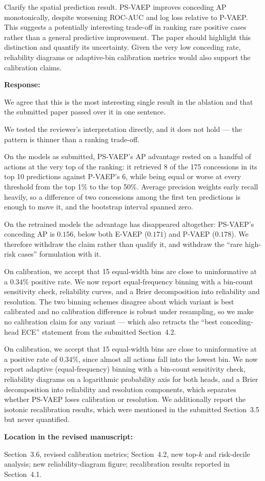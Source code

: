 \documentclass[11pt,a4paper]{article}
\newcommand{\pending}[1]{\textcolor{statuspending}{#1}}
\newcommand{\response}[2]{%
  \begin{responsebox}
  \textbf{Response:}

  #1
  \end{responsebox}
  \begin{locationbox}
  \textbf{Location in the revised manuscript:}

  #2
  \end{locationbox}
}
\begin{document}
\begin{reviewbox}[Comment 4]
Clarify the spatial prediction result. PS-VAEP improves conceding AP monotonically, despite worsening ROC-AUC and log loss relative to P-VAEP. This suggests a potentially interesting trade-off in ranking rare positive cases rather than a general predictive improvement. The paper should highlight this distinction and quantify its uncertainty. Given the very low conceding rate, reliability diagrams or adaptive-bin calibration metrics would also support the calibration claims.
\end{reviewbox}
\response{We agree that this is the most interesting single result in the ablation and that the submitted paper passed over it in one sentence.

We tested the reviewer's interpretation directly, and it does not hold --- the pattern is thinner than a ranking trade-off.

On the models as submitted, PS-VAEP's AP advantage rested on a handful of actions at the very top of the ranking: it retrieved 8 of the 175 concessions in its top 10 predictions against P-VAEP's 6, while being equal or worse at every threshold from the top 1\% to the top 50\%. Average precision weights early recall heavily, so a difference of two concessions among the first ten predictions is enough to move it, and the bootstrap interval spanned zero.

On the retrained models the advantage has disappeared altogether: PS-VAEP's conceding AP is $0.156$, below both E-VAEP ($0.171$) and P-VAEP ($0.178$). We therefore withdraw the claim rather than qualify it, and withdraw the ``rare high-risk cases'' formulation with it.

On calibration, we accept that 15 equal-width bins are close to uninformative at a $0.34\%$ positive rate. We now report equal-frequency binning with a bin-count sensitivity check, reliability curves, and a Brier decomposition into reliability and resolution. The two binning schemes disagree about which variant is best calibrated and no calibration difference is robust under resampling, so we make no calibration claim for any variant --- which also retracts the ``best conceding-head ECE'' statement from the submitted Section~4.2.

\pending{On calibration, we accept that 15 equal-width bins are close to uninformative at a positive rate of $0.34\%$, since almost all actions fall into the lowest bin. We now report adaptive (equal-frequency) binning with a bin-count sensitivity check, reliability diagrams on a logarithmic probability axis for both heads, and a Brier decomposition into reliability and resolution components, which separates whether PS-VAEP loses calibration or resolution. We additionally report the isotonic recalibration results, which were mentioned in the submitted Section~3.5 but never quantified.}}{Section~3.6, revised calibration metrics; Section~4.2, new top-$k$ and risk-decile analysis; new reliability-diagram figure; recalibration results reported in Section~4.1.}
\end{document}
